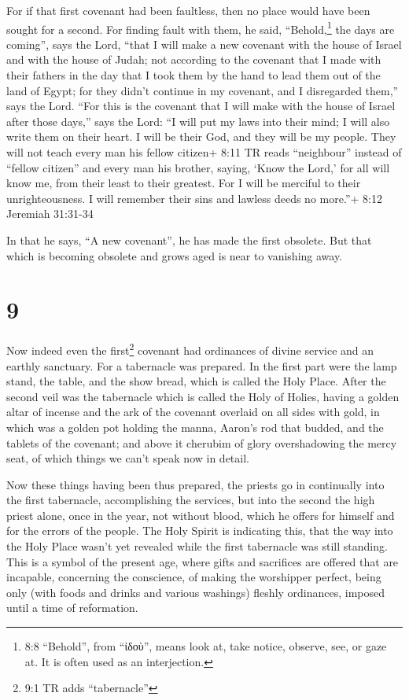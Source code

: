  For if that first covenant had been faultless, then no
place would have been sought for a second.  For finding
fault with them, he said, ``Behold,\footnote{8:8 ``Behold'', from
  ``ἰδοὺ'', means look at, take notice, observe, see, or gaze at. It is
  often used as an interjection.} the days are coming'', says the Lord,
``that I will make a new covenant with the house of Israel and with the
house of Judah;  not according to the covenant that I made
with their fathers in the day that I took them by the hand to lead them
out of the land of Egypt; for they didn't continue in my covenant, and I
disregarded them,'' says the Lord.  ``For this is the
covenant that I will make with the house of Israel after those days,''
says the Lord: ``I will put my laws into their mind; I will also write
them on their heart. I will be their God, and they will be my people.
 They will not teach every man his fellow citizen+ 8:11 TR
reads ``neighbour'' instead of ``fellow citizen'' and every man his
brother, saying, `Know the Lord,' for all will know me, from their least
to their greatest.  For I will be merciful to their
unrighteousness. I will remember their sins and lawless deeds no
more.''+ 8:12 Jeremiah 31:31-34

 In that he says, ``A new covenant'', he has made the first
obsolete. But that which is becoming obsolete and grows aged is near to
vanishing away.

\hypertarget{section-8}{%
\section{9}\label{section-8}}

 Now indeed even the first\footnote{9:1 TR adds
  ``tabernacle''} covenant had ordinances of divine service and an
earthly sanctuary.  For a tabernacle was prepared. In the
first part were the lamp stand, the table, and the show bread, which is
called the Holy Place.  After the second veil was the
tabernacle which is called the Holy of Holies,  having a
golden altar of incense and the ark of the covenant overlaid on all
sides with gold, in which was a golden pot holding the manna, Aaron's
rod that budded, and the tablets of the covenant;  and above
it cherubim of glory overshadowing the mercy seat, of which things we
can't speak now in detail.

 Now these things having been thus prepared, the priests go
in continually into the first tabernacle, accomplishing the services,
 but into the second the high priest alone, once in the
year, not without blood, which he offers for himself and for the errors
of the people.  The Holy Spirit is indicating this, that the
way into the Holy Place wasn't yet revealed while the first tabernacle
was still standing.  This is a symbol of the present age,
where gifts and sacrifices are offered that are incapable, concerning
the conscience, of making the worshipper perfect,  being
only (with foods and drinks and various washings) fleshly ordinances,
imposed until a time of reformation.

